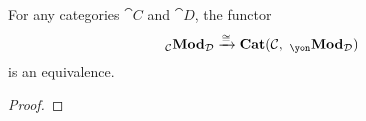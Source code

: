 \documentclass[Book-Poly]{subfiles}
\begin{document}
\begin{theorem} \label{thm.pra_tensored_cat}
For any categories $\cat{C}$ and $\cat{D}$, the functor 
\[
    \bimod{\cat{C}}{\cat{D}} \To{\cong} \smcat(\cat{C}, \bimod{\yon}{\cat{D}})
\]
is an equivalence.
\end{theorem}
\begin{proof}

\end{proof}
\end{document}

